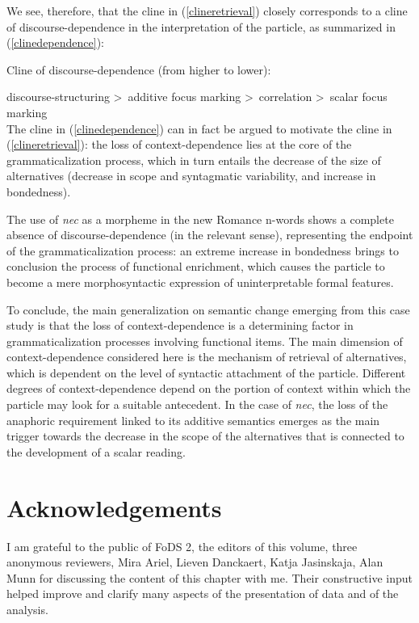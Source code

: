 \documentclass[output=paper,modfonts,nonflat,citecolor=brown,
showindex
]{langsci/langscibook}
\begin{document}
We see, therefore, that the cline in (\ref{clineretrieval}) closely corresponds to a cline of discourse-dependence in the interpretation of the particle, as summarized in (\ref{clinedependence}):

{\begin{exe}
\ex \label{clinedependence} Cline of discourse-dependence (from higher to lower):
\end{exe}}
\noindent discourse-structuring \textgreater \ additive focus marking \textgreater \ correlation \textgreater \ scalar focus marking\\

\noindent The cline in (\ref{clinedependence}) can in fact be argued to motivate the cline in (\ref{clineretrieval}): the loss of context-dependence lies at the core of the grammaticalization process, which in turn entails the decrease of the size of alternatives (decrease in scope and syntagmatic variability, and increase in bondedness).

The use of {\emph{nec}} as a morpheme in the new Romance n-words shows a complete absence of discourse-dependence (in the relevant sense), representing the endpoint of the grammaticalization process: an extreme increase in bondedness brings to conclusion the process of functional enrichment, which causes the particle to become a mere morphosyntactic expression of uninterpretable formal features.

To conclude, the main generalization on semantic change emerging from this case study is that the loss of context-dependence is a determining factor in grammaticalization processes involving functional items. The main dimension of context-dependence considered here is the mechanism of retrieval of alternatives, which is dependent on the level of syntactic attachment of the particle. Different degrees of context-dependence depend on the portion of context within which the particle may look for a suitable antecedent. In the case of {\emph{nec}}, the loss of the anaphoric requirement linked to its additive semantics emerges as the main trigger towards the decrease in the scope of the alternatives that is connected to the development of a scalar reading.  


\section*{Acknowledgements}
I am grateful to the public of FoDS 2, the editors of this volume, three anonymous reviewers, Mira Ariel, Lieven Danckaert, Katja Jasinskaja, Alan Munn for discussing the content of this chapter with me. Their constructive input helped improve and clarify many aspects of the presentation of data and of the analysis. 

\printbibliography[heading=subbibliography,notkeyword=this]
\end{document}
